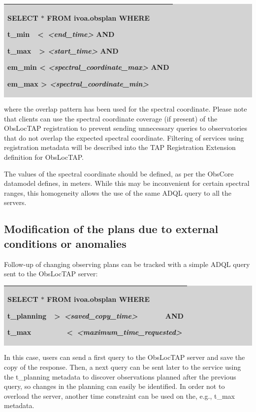 \documentclass[11pt,a4paper]{ivoa}
\begin{document}
\bigskip
\par
\begingroup\setlength{\fboxsep}{0pt}
\colorbox{lightgray}{%
\begin{tabular}{|p{5.53in}|}
\hline
SELECT $\ast$  FROM ivoa.obsplan WHERE  \par  t\_min\ \ <\   \textit{<end\_time>} AND \par  t\_max\ \ >  \textit{<start\_time> } AND \par  em\_min < \textit{<spectral\_coordinate\_max>} AND \par  em\_max > \textit{<spectral\_coordinate\_min>} \\
\hline
\end{tabular}%
}\endgroup
\par
\bigskip
where the overlap pattern has been used for the spectral coordinate. Please note that clients can use the spectral coordinate coverage (if present) of the ObsLocTAP registration to prevent sending unnecessary queries to observatories that do not overlap the expected spectral coordinate. Filtering of services using registration metadata will be described into the TAP Registration Extension definition for ObsLocTAP.
\par

The values of the spectral coordinate should be defined, as per the ObsCore datamodel defines, in meters. While this may be inconvenient for certain spectral ranges, this homogeneity allows the use of the same ADQL query to all the servers.

\subsection{Modification of the plans due to external conditions or anomalies}
Follow-up of changing observing plans can be tracked with a simple ADQL query sent to the ObsLocTAP server:


\bigskip
\par
\begingroup\setlength{\fboxsep}{0pt}
\colorbox{lightgray}{%
\begin{tabular}{|p{5.53in}|}
\hline
SELECT $\ast$  FROM ivoa.obsplan WHERE  \par  t\_planning\ \ >\   \textit{<saved\_copy\_time>}\ \ \ \ \ \ \  AND  \par  t\_max\ \ \ \ \ \ \ \ \ <\   \textit{<maximum\_time\_requested>} \\
\hline
\end{tabular}%
}\endgroup
\par
\bigskip
In this case, users can send a first query to the ObsLocTAP server and save the copy of the response. Then, a next query can be sent later to the service using the t\_planning metadata to discover observations planned after the previous query, so changes in the planning can easily be identified. In order not to overload the server, another time constraint can be used on the, e.g., t\_max metadata.
\par
\end{document}
